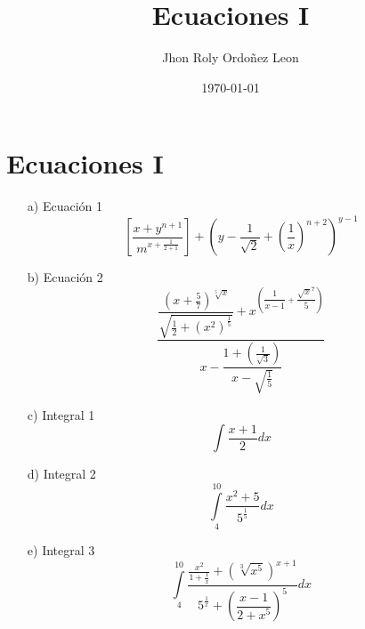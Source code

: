 \documentclass[11pt]{article}
\title{Ecuaciones I}
\author{Jhon Roly Ordoñez Leon}
\date{\today}
\begin{document}
    \maketitle
    \section{Ecuaciones I}
     \begin{itemize}
         \item[a)] Ecuación 1
         \[
            \left[ \dfrac{x + y^{n+1}}{m^{x+\frac{1}{2+1}}}  \right] +  \left( y- \dfrac{1}{\sqrt{2}} + \left(\dfrac{1}{x} \right)^{n+2}  \right)^{y-1}
         \]
         \item[b)] Ecuación 2
         \[
             \dfrac{ \dfrac{(x+\frac{5}{7})^{\sqrt[5]{x}}}{\sqrt{\frac{1}{2}+(x^{2})^{\frac{1}{5}}}} +x^{\left(\dfrac{1}{x-1} + \dfrac{\sqrt{x}^{7}}{5} \right)}   }{x-\dfrac{1+ \left(\frac{1}{\sqrt{3}}\right)  }{x-\sqrt{\frac{1}{5}}} }
         \]
         \item[c)] Integral 1
         \[
             \int\dfrac{x+1}{2}dx
         \]
         \item[d)] Integral 2
         \[
             \int\limits_{4}^{10} \dfrac{x^{2}+5}{5^{\frac{1}{5}}}dx
         \]
         \item[e)] Integral 3
         \[
            \int\limits_{4}^{10} \dfrac{  \frac{x^{2}}{1+\frac{1}{x}} +  \left(\sqrt[3]{x^{5}} \right)^{x+1} }{5^{\frac{1}{x}} + \left(\dfrac{x-1}{2+x^{5}}\right)^{5} }dx
         \] 
     \end{itemize}
     \newpage
\end{document}
